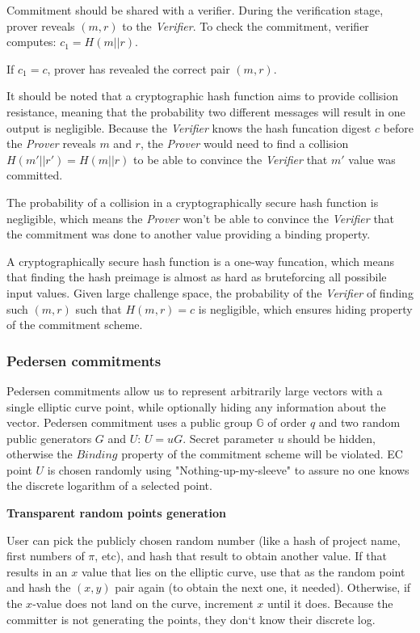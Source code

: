\documentclass[../lecture-notes.tex]{subfiles}
\begin{document}
Commitment should be shared with a verifier. During the verification stage, prover reveals $(m, r)$ to the \textit{Verifier}. 
To check the commitment, verifier computes: $c_1 = H(m || r)$.

If $c_1 = c$, prover has revealed the correct pair $(m, r)$.

It should be noted that a cryptographic hash function aims to provide collision resistance, 
meaning that the probability two different messages will result in one output is negligible.
Because the \textit{Verifier} knows the hash funcation digest $c$ before the \textit{Prover} reveals $m$ and $r$, 
the \textit{Prover} would need to find a collision $H(m' || r') = H(m || r)$ to be able to convince the \textit{Verifier}
that $m'$ value was committed.

The probability of a collision in a cryptographically secure hash function is negligible, which means the \textit{Prover}
won't be able to convince the \textit{Verifier} that the commitment was done to another value providing a binding property.

A cryptographically secure hash function is a one-way funcation, which means that finding the hash preimage is almost as hard as bruteforcing
all possibile input values. Given large challenge space, the probability of the \textit{Verifier} of finding such $(m, r)$ such that
$H(m, r) = c$ is negligible, which ensures hiding property of the commitment scheme. 


\subsubsection{Pedersen commitments}

Pedersen commitments allow us to represent arbitrarily large vectors with a single elliptic curve point, while optionally hiding any information about the vector. Pedersen commitment uses a public group $\mathbb{G}$ of order $q$ and two random public generators $G$ and $U$: $U = uG$. Secret parameter $u$ should be hidden, otherwise the $\textit{Binding}$ property of the commitment scheme will be violated.
EC point $U$ is chosen randomly using "Nothing-up-my-sleeve" to assure no one knows the discrete logarithm of a selected point.

\begin{remark}
    \textbf{Transparent random points generation}

    User can pick the publicly chosen random number (like a hash of project name, first numbers of $\pi$, etc), and hash that result to obtain another value. If that results in an $x$ value that lies on the elliptic curve, use that as the random point and hash the $(x, y)$ pair again (to obtain the next one, it needed). Otherwise, if the $x$-value does not land on the curve, increment $x$ until it does. Because the committer is not generating the points, they don`t know their discrete log. 
\end{remark}
\end{document}
